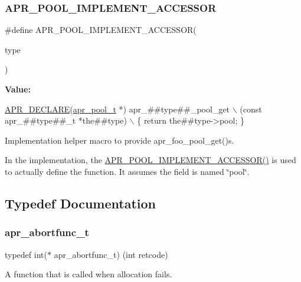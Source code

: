 \subsubsection{\texorpdfstring{A\+P\+R\+\_\+\+P\+O\+O\+L\+\_\+\+I\+M\+P\+L\+E\+M\+E\+N\+T\+\_\+\+A\+C\+C\+E\+S\+S\+OR}{APR\_POOL\_IMPLEMENT\_ACCESSOR}}
{\footnotesize\ttfamily \#define A\+P\+R\+\_\+\+P\+O\+O\+L\+\_\+\+I\+M\+P\+L\+E\+M\+E\+N\+T\+\_\+\+A\+C\+C\+E\+S\+S\+OR(\begin{DoxyParamCaption}\item[{}]{type }\end{DoxyParamCaption})}

{\bfseries Value\+:}
\begin{DoxyCode}
\mbox{\hyperlink{group__apr__pools_ga95a4b4050d59535eea61951c649d49e6}{APR\_DECLARE}}(\mbox{\hyperlink{group__apr__pools_gaf137f28edcf9a086cd6bc36c20d7cdfb}{apr\_pool\_t}} *) apr\_##type##\_pool\_get \(\backslash\)
            (\textcolor{keyword}{const} apr\_##type##\_t *the##type) \(\backslash\)
        \{ \textcolor{keywordflow}{return} the##type->pool; \}
\end{DoxyCode}
Implementation helper macro to provide apr\+\_\+foo\+\_\+pool\+\_\+get()s.

In the implementation, the \mbox{\hyperlink{group__apr__pools_ga43a8a52f68f8b7d3b7694c254da4a074}{A\+P\+R\+\_\+\+P\+O\+O\+L\+\_\+\+I\+M\+P\+L\+E\+M\+E\+N\+T\+\_\+\+A\+C\+C\+E\+S\+S\+O\+R()}} is used to actually define the function. It assumes the field is named \char`\"{}pool\char`\"{}. 

\subsection{Typedef Documentation}
\mbox{\label{group__apr__pools_ga370a939349adf6d1438068e2fc69a0dd}} 
\subsubsection{\texorpdfstring{apr\+\_\+abortfunc\+\_\+t}{apr\_abortfunc\_t}}
{\footnotesize\ttfamily typedef int($\ast$ apr\+\_\+abortfunc\+\_\+t) (int retcode)}

A function that is called when allocation fails. \mbox{\label{group__apr__pools_gaf137f28edcf9a086cd6bc36c20d7cdfb}} 
